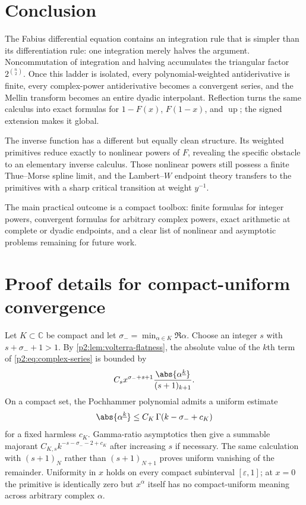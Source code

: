 \documentclass[11pt,oneside]{article}
\theoremstyle{definition}
\theoremstyle{remark}
\newcommand{\Up}{\operatorname{up}}
\newcommand{\C}{\mathbb C}
\newcommand{\fall}[2]{#1^{\underline{#2}}}
\newcommand{\1}{\mathbf 1}
\begin{document}
\section{Conclusion}
\label{p2:sec:conclusion}

The Fabius differential equation contains an integration rule that is simpler
than its differentiation rule: one integration merely halves the argument.
Noncommutation of integration and halving accumulates the triangular factor
$2^{\binom n2}$.  Once this ladder is isolated, every polynomial-weighted
antiderivative is finite, every complex-power antiderivative becomes a
convergent series, and the Mellin transform becomes an entire dyadic
interpolant.  Reflection turns the same calculus into exact formulas for
$1-F(x)$, $F(1-x)$, and $\Up$; the signed extension makes it global.

The inverse function has a different but equally clean structure.  Its
weighted primitives reduce exactly to nonlinear powers of $F$, revealing the
specific obstacle to an elementary inverse calculus.  Those nonlinear powers
still possess a finite Thue--Morse spline limit, and the Lambert--$W$ endpoint
theory transfers to the primitives with a sharp critical transition at weight
$y^{-1}$.

The main practical outcome is a compact toolbox: finite formulas for integer
powers, convergent formulas for arbitrary complex powers, exact arithmetic at
complete or dyadic endpoints, and a clear list of nonlinear and asymptotic
problems remaining for future work.

\appendix
\section{Proof details for compact-uniform convergence}
\label{p2:app:uniform}

Let $K\subset\C$ be compact and let
$\sigma_- =\min_{\alpha\in K}\Re\alpha$.  Choose an integer $s$ with
$s+\sigma_-+1>1$.  By \cref{p2:lem:volterra-flatness}, the absolute value of the
$k$th term of \eqref{p2:eq:complex-series} is bounded by
\begin{equation}
 C_s x^{\sigma_-+s+1}
 \frac{\abs{\fall{\alpha}{k}}}{(s+1)_{k+1}}.              \label{p2:eq:uniform-term-bound}
\end{equation}
On a compact set, the Pochhammer polynomial admits a uniform estimate
\begin{equation}
 \abs{\fall{\alpha}{k}}\le C_K\,\Gamma(k-\sigma_-+c_K)   \label{p2:eq:pochhammer-uniform}
\end{equation}
for a fixed harmless $c_K$.  Gamma-ratio asymptotics then give a summable
majorant $C_{K,s}k^{-s-\sigma_- -2+c_K}$ after increasing $s$ if necessary.
The same calculation with $(s+1)_N$ rather than $(s+1)_{N+1}$ proves uniform
vanishing of the remainder.  Uniformity in $x$ holds on every compact
subinterval $[\varepsilon,1]$; at $x=0$ the primitive is identically zero but
$x^\alpha$ itself has no compact-uniform meaning across arbitrary complex
$\alpha$.
\end{document}
